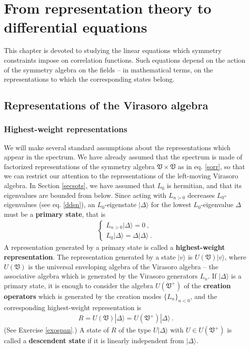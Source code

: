 \documentclass[12pt,a4paper,notitlepage]{report}
\numberwithin{equation}{section}
\theoremstyle{break}
\begin{document}
\chapter{From representation theory to differential equations \label{secccs}}

This chapter is devoted to studying the linear equations which symmetry constraints impose on correlation functions.
Such equations depend on the action of the symmetry algebra on the fields -- in mathematical terms, on the representations to which the corresponding states belong. 

\section{Representations of the Virasoro algebra \label{secrep}}

\subsection{Highest-weight representations}

We will make several standard assumptions about the representations which appear in the spectrum.
We have already assumed that the spectrum is made of factorized representations of the symmetry algebra $\mathfrak{V}\times \overline{\mathfrak{V}}$ as in eq. \eqref{sorr}, so that we can restrict our attention to the representations of the left-moving Virasoro algebra.
In Section \ref{secsots}, we have assumed that $L_0$ is hermitian, and that its eigenvalues are bounded from below.
Since acting with $L_{n>0}$ decreases $L_0$-eigenvalues (see eq. \eqref{ddsn}), an $L_0$-eigenstate $|\Delta\rangle$ for the lowest $L_0$-eigenvalue $\Delta$ must be a \textbf{\boldmath primary state}, that is
\begin{align}
 \boxed{\left\{\begin{array}{l}  L_{n>0}|\Delta\rangle = 0\ , \\ L_0 |\Delta\rangle = \Delta |\Delta\rangle\ .\end{array}\right. }
\label{lvlv}
\end{align}
A representation generated by a primary state is called a \textbf{\boldmath highest-weight representation}.
The representation generated by a state $|v\rangle$ is $U(\mathfrak{V})|v\rangle$, where $U(\mathfrak{V})$ is the universal enveloping algebra of the Virasoro algebra -- the associative algebra which is generated by the Virasoro generators $L_n$.
If $|\Delta\rangle$ is a primary state, it is enough to consider the algebra $U(\mathfrak{V}^+)$ of the \textbf{\boldmath creation operators} which is generated by the creation modes $\{L_n\}_{n<0}$, and the corresponding highest-weight representation is 
\begin{align}
 R = U(\mathfrak{V})|\Delta\rangle =U(\mathfrak{V}^+)|\Delta\rangle\ .
\label{ruv}
\end{align}
(See Exercise \ref{exospan}.)
A state of $R$ of the type $U|\Delta\rangle$ with $U\in U(\mathfrak{V}^+)$ is called a \textbf{\boldmath descendent state} if it is linearly independent from $|\Delta\rangle$.
\end{document}

